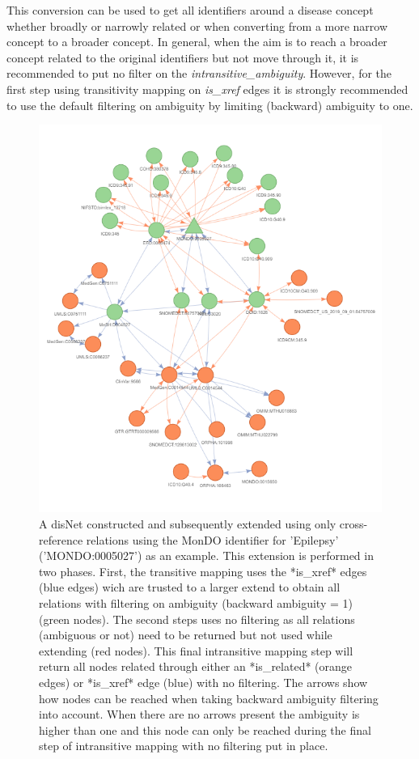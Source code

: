 \documentclass[9pt,a4paper,]{extarticle}
\begin{document}
This conversion can be used to get all identifiers around a disease concept whether broadly or narrowly related or when converting from a more narrow concept to a broader concept. In general, when the aim is to reach a broader concept related to the original identifiers but not move through it, it is recommended to put no filter on the \emph{intransitive\_ambiguity}. However, for the first step using transitivity mapping on \emph{is\_xref} edges it is strongly recommended to use the default filtering on ambiguity by limiting (backward) ambiguity to one.

\begin{figure}

{\centering \includegraphics[width=0.75\linewidth]{fig/disNetExtension} 

}

\caption{A disNet constructed and subsequently extended using only cross-reference relations using the MonDO identifier for 'Epilepsy' ('MONDO:0005027') as an example. This extension is performed in two phases. First, the transitive mapping uses the *is\_xref* edges (blue edges) wich are trusted to a larger extend to obtain all relations with filtering on ambiguity (backward ambiguity = 1) (green nodes). The second steps uses no filtering as all relations (ambiguous or not) need to be returned but not used while extending (red nodes). This final intransitive mapping step will return all nodes related through either an *is\_related* (orange edges) or *is\_xref* edge (blue) with no filtering. The arrows show how nodes can be reached when taking backward ambiguity filtering into account. When there are no arrows present the ambiguity is higher than one and this node can only be reached during the final step of intransitive mapping with no filtering put in place.}\label{fig:extension}
\end{figure}
\end{document}

